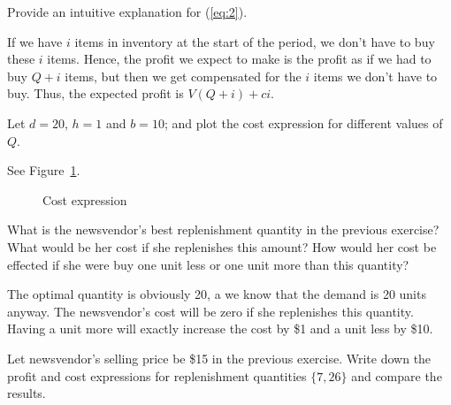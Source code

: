 \begin{question}
Provide an intuitive explanation for (\ref{eq:2}). 
\end{question}
\begin{solution}
  If we have $i$ items in inventory at the start of the period, we
  don't have to buy these $i$ items. Hence, the profit we expect to
  make is the profit as if we had to buy $Q+i$ items, but then we get
  compensated for the $i$ items we don't have to buy. Thus, the
  expected profit is $V(Q+i) + ci$.
\end{solution}

\begin{question}\label{ex:nw_det}
Let $d=20$, $h=1$ and $b=10$; and plot the cost expression for different values of $Q$. 
\end{question}

\begin{solution}
See Figure~\ref{fig:cost_expression}.

\begin{figure}[htbp]
\centering
{}
\caption{Cost expression}
\label{fig:cost_expression}
\end{figure}
\end{solution}

\begin{question}
What is the newsvendor's best replenishment quantity in the previous exercise? What would be her cost if she replenishes this amount? How would her cost be effected if she were buy one unit less or one unit more than this quantity?
\end{question}

\begin{solution}
The optimal quantity is obviously 20, a we know that the demand is 20 units anyway. The newsvendor's cost will be zero if she replenishes this quantity. Having a unit more will exactly increase the cost by \$1 and a unit less by \$10.
\end{solution}

\begin{question}
Let newsvendor's selling price be \$15 in the previous exercise. Write down the profit and cost expressions for replenishment quantities $\{7,26\}$ and compare the results.
\end{question}

